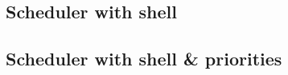 \documentclass[a4paper,10pt]{article} \usepackage{anysize}
\begin{document}
\subsection{Scheduler with shell}

\subsection{Scheduler with shell \& priorities}

\end{document}
